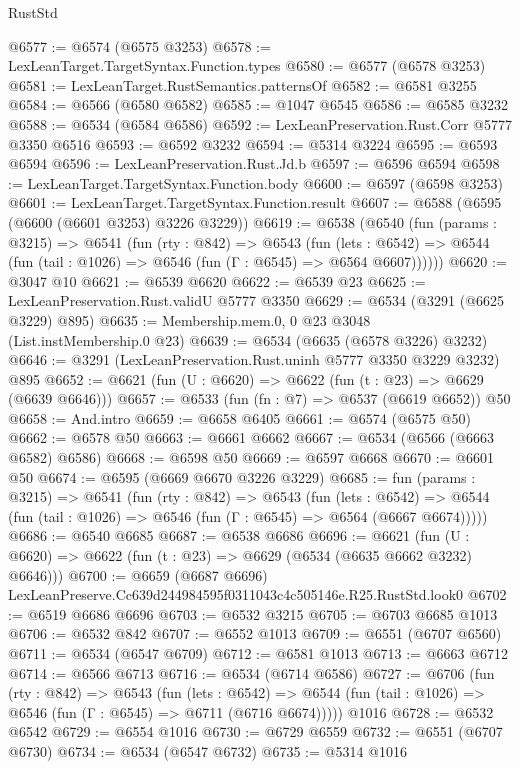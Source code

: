 \begin{lexlean}{RustStd}
\begin{coremodule}
@6577 := @6574 (@6575 @3253)
@6578 := LexLeanTarget.TargetSyntax.Function.types
@6580 := @6577 (@6578 @3253)
@6581 := LexLeanTarget.RustSemantics.patternsOf
@6582 := @6581 @3255
@6584 := @6566 (@6580 @6582)
@6585 := @1047 @6545
@6586 := @6585 @3232
@6588 := @6534 (@6584 @6586)
@6592 := LexLeanPreservation.Rust.Corr @5777 @3350 @6516
@6593 := @6592 @3232
@6594 := @5314 @3224
@6595 := @6593 @6594
@6596 := LexLeanPreservation.Rust.Jd.b
@6597 := @6596 @6594
@6598 := LexLeanTarget.TargetSyntax.Function.body
@6600 := @6597 (@6598 @3253)
@6601 := LexLeanTarget.TargetSyntax.Function.result
@6607 := @6588 (@6595 (@6600 (@6601 @3253) @3226 @3229))
@6619 := @6538
    (@6540
      (fun (params : @3215) =>
      @6541
        (fun (rty : @842) =>
        @6543
          (fun (lets : @6542) =>
          @6544 (fun (tail : @1026) => @6546 (fun (Γ : @6545) => @6564 @6607))))))
@6620 := @3047 @10
@6621 := @6539 @6620
@6622 := @6539 @23
@6625 := LexLeanPreservation.Rust.validU @5777 @3350
@6629 := @6534 (@3291 (@6625 @3229) @895)
@6635 := Membership.mem.{0, 0} @23 @3048 (List.instMembership.{0} @23)
@6639 := @6534 (@6635 (@6578 @3226) @3232)
@6646 := @3291 (LexLeanPreservation.Rust.uninh @5777 @3350 @3229 @3232) @895
@6652 := @6621 (fun (U : @6620) => @6622 (fun (t : @23) => @6629 (@6639 @6646)))
@6657 := @6533 (fun (fn : @7) => @6537 (@6619 @6652)) @50
@6658 := And.intro
@6659 := @6658 @6405
@6661 := @6574 (@6575 @50)
@6662 := @6578 @50
@6663 := @6661 @6662
@6667 := @6534 (@6566 (@6663 @6582) @6586)
@6668 := @6598 @50
@6669 := @6597 @6668
@6670 := @6601 @50
@6674 := @6595 (@6669 @6670 @3226 @3229)
@6685 := fun (params : @3215) =>
  @6541
    (fun (rty : @842) =>
    @6543
      (fun (lets : @6542) =>
      @6544 (fun (tail : @1026) => @6546 (fun (Γ : @6545) => @6564 (@6667 @6674)))))
@6686 := @6540 @6685
@6687 := @6538 @6686
@6696 := @6621 (fun (U : @6620) => @6622 (fun (t : @23) => @6629 (@6534 (@6635 @6662 @3232) @6646)))
@6700 := @6659 (@6687 @6696) LexLeanPreserve.Cc639d244984595f0311043c4c505146e.R25.RustStd.look0
@6702 := @6519 @6686 @6696
@6703 := @6532 @3215
@6705 := @6703 @6685 @1013
@6706 := @6532 @842
@6707 := @6552 @1013
@6709 := @6551 (@6707 @6560)
@6711 := @6534 (@6547 @6709)
@6712 := @6581 @1013
@6713 := @6663 @6712
@6714 := @6566 @6713
@6716 := @6534 (@6714 @6586)
@6727 := @6706
    (fun (rty : @842) =>
    @6543
      (fun (lets : @6542) =>
      @6544 (fun (tail : @1026) => @6546 (fun (Γ : @6545) => @6711 (@6716 @6674)))))
    @1016
@6728 := @6532 @6542
@6729 := @6554 @1016
@6730 := @6729 @6559
@6732 := @6551 (@6707 @6730)
@6734 := @6534 (@6547 @6732)
@6735 := @5314 @1016

\end{coremodule}
\end{lexlean}
